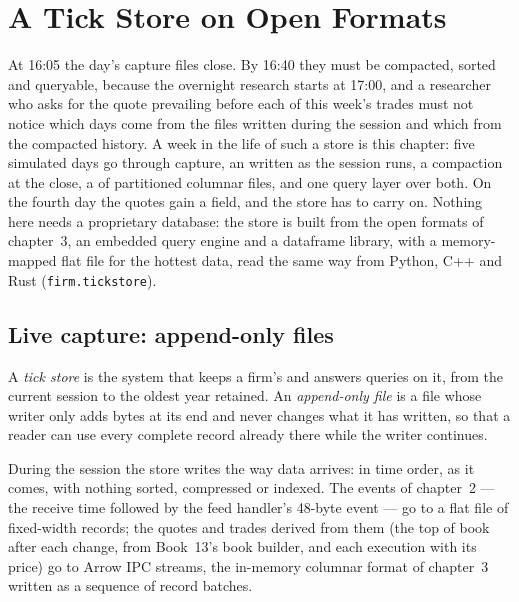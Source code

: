 \chapter{A Tick Store on Open Formats}\label{ch:pl:a-tick-store-on-open-formats}

At 16:05 the day's capture files close. By 16:40 they must be compacted, sorted and queryable, because the overnight research
starts at 17:00, and a researcher who asks for the quote prevailing before each of this week's trades must not notice which
days come from the files written during the session and which from the compacted history. A week in the life of such a store
is this chapter: five simulated days go through capture, an  written as the session runs, a compaction at the
close, a  of partitioned columnar files, and one query layer over both. On the fourth day the quotes gain a
field, and the store has to carry on. Nothing here needs a proprietary database: the store is built from the open formats of
chapter~3, an embedded query engine and a dataframe library, with a memory-mapped flat file for the hottest data, read the same
way from Python, C++ and Rust (\texttt{firm.tickstore}).

\section{Live capture: append-only files}

\begin{definition}\label{def:pl:a-tick-store-on-open-formats:store}
A \emph{tick store} is the system that keeps a firm's  and answers queries on it, from the current
session to the oldest year retained. An \emph{append-only file} is a file whose writer only adds bytes at
its end and never changes what it has written, so that a reader can use every complete record already there while the writer
continues.
\end{definition}

During the session the store writes the way data arrives: in time order, as it comes, with nothing sorted, compressed or
indexed. The events of chapter~2 --- the receive time followed by the feed handler's 48-byte event --- go to a flat file of
fixed-width records; the quotes and trades derived from them (the top of book after each change, from Book~13's book builder,
and each execution with its price) go to Arrow IPC streams, the in-memory columnar format of chapter~3 written as a sequence of
record batches.

